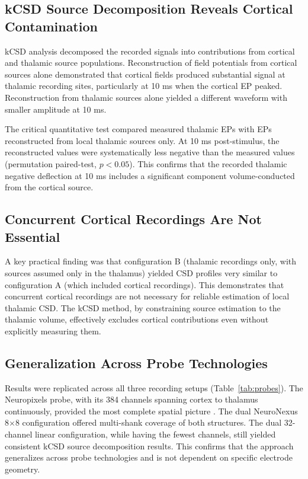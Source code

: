 \documentclass[12pt]{article}
\begin{document}
\subsection{kCSD Source Decomposition Reveals Cortical Contamination}

kCSD analysis decomposed the recorded signals into contributions from cortical and thalamic source populations. Reconstruction of field potentials from cortical sources alone demonstrated that cortical fields produced substantial signal at thalamic recording sites, particularly at 10 ms when the cortical EP peaked. Reconstruction from thalamic sources alone yielded a different waveform with smaller amplitude at 10 ms.

The critical quantitative test compared measured thalamic EPs with EPs reconstructed from local thalamic sources only. At 10 ms post-stimulus, the reconstructed values were systematically less negative than the measured values (permutation paired-test, $p < 0.05$). This confirms that the recorded thalamic negative deflection at 10 ms includes a significant component volume-conducted from the cortical source.

\subsection{Concurrent Cortical Recordings Are Not Essential}

A key practical finding was that configuration B (thalamic recordings only, with sources assumed only in the thalamus) yielded CSD profiles very similar to configuration A (which included cortical recordings). This demonstrates that concurrent cortical recordings are not necessary for reliable estimation of local thalamic CSD. The kCSD method, by constraining source estimation to the thalamic volume, effectively excludes cortical contributions even without explicitly measuring them.

\subsection{Generalization Across Probe Technologies}

Results were replicated across all three recording setups (Table~\ref{tab:probes}). The Neuropixels probe, with its 384 channels spanning cortex to thalamus continuously, provided the most complete spatial picture \citep{jun2017neuropixels}. The dual NeuroNexus 8$\times$8 configuration offered multi-shank coverage of both structures. The dual 32-channel linear configuration, while having the fewest channels, still yielded consistent kCSD source decomposition results. This confirms that the approach generalizes across probe technologies and is not dependent on specific electrode geometry.
\end{document}
